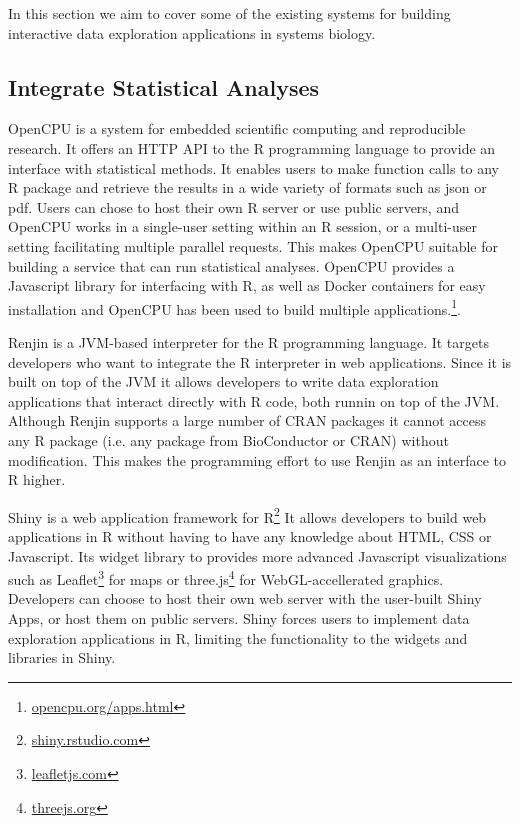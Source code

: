 In this section we aim to cover some of the existing systems for building
interactive data exploration applications in systems biology. 

\subsection*{Integrate Statistical Analyses} 
OpenCPU is a system for embedded scientific computing and reproducible
research.\cite{opencpu} It offers an HTTP API to the R programming language to
provide an interface with statistical methods. It enables users to make function
calls to any R package and retrieve the results in a wide variety of formats
such as json or pdf. 
Users can chose to host their own R server or use public servers, and OpenCPU
works in a single-user setting within an R session, or a multi-user setting
facilitating multiple parallel requests. This makes OpenCPU suitable
for building a service that can run statistical analyses. 
OpenCPU provides a Javascript library for interfacing with R, as well as Docker
containers for easy installation and OpenCPU has been used to build multiple
applications.\footnote{\url{opencpu.org/apps.html}}.

Renjin is a JVM-based interpreter for the R programming language.\cite{renjin}
It targets developers who want to integrate the R interpreter in web
applications. Since it is built on top of the JVM it allows developers to write
data exploration applications that interact directly with R code, both runnin on
top of the JVM. Although Renjin supports a large number of CRAN packages it
cannot access any R package (i.e.  any package from BioConductor or CRAN)
without modification. This makes the programming effort to use Renjin as an
interface to R higher. 

Shiny is a web application framework for R\footnote{\url{shiny.rstudio.com}}
It allows developers to
build web applications in R without having to have any knowledge about HTML, CSS
or Javascript. Its widget library to provides more advanced Javascript
visualizations such as Leaflet\footnote{\url{leafletjs.com}} for maps or
three.js\footnote{\url{threejs.org}} for WebGL-accellerated
graphics. Developers can choose to host their own web server with the user-built
Shiny Apps, or host them on public servers. Shiny forces users to implement data
exploration applications in R, limiting the functionality to the 
widgets and libraries in Shiny. 

